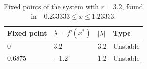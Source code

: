 \begin{table}
\centering
\caption{Fixed points of the system with $r = 3.2$, found in $-0.233333 \le x \le 1.23333$.}
\label{tab:logistic-map-fixed-points}
\begin{tabular}{@{}llll@{}}
\toprule
Fixed point & $\lambda = f'(x^*)$ & $\lvert\lambda\rvert$ & Type \\
\midrule
$\num{0}$ & $\num{3.2}$ & \num{3.2} & Unstable \\
$\num{0.6875}$ & $\num{-1.2}$ & \num{1.2} & Unstable \\
\bottomrule
\end{tabular}
\end{table}
